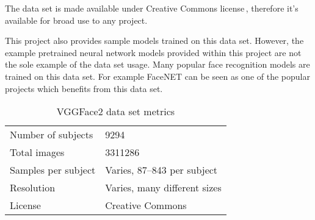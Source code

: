 The data set is made available under Creative Commons license\,\cite{cc_by-sa_40}, therefore it's available for broad use to any project.

This project also provides sample models trained on this data set. However, the example pretrained neural network models provided within this project are not the sole example of the data set usage. Many popular face recognition models are trained on this data set. For example FaceNET can be seen as one of the popular projects which benefits from this data set.

\begin{table}[ht]
    \centering
    \caption{VGGFace2 data set metrics}

    \begin{tabularx}{0.75\textwidth}{l|l}
        \toprule
        Number of subjects & \num{9294} \\
        Total images & \num{3311286} \\
        Samples per subject & Varies, 87--843 per subject \\
        Resolution & Varies, many different sizes \\
        License & Creative Commons\,\cite{cc_by-sa_40} \\
        \bottomrule
    \end{tabularx}
\end{table}
